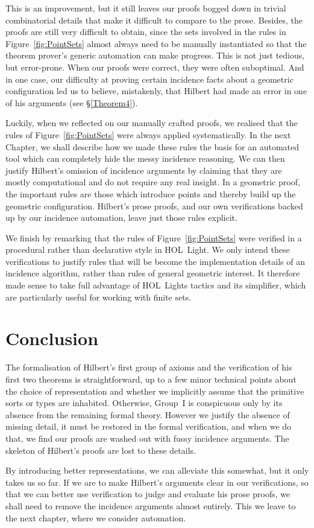 This is an improvement, but it still leaves our proofs bogged down in trivial combinatorial details that make it difficult to compare to the prose. Besides, the proofs are still very difficult to obtain, since the sets involved in the rules in Figure~\ref{fig:PointSets} almost always need to be manually instantiated so that the theorem prover's generic automation can make progress. This is not just tedious, but error-prone. When our proofs were correct, they were often suboptimal. And in one case, our difficulty at proving certain incidence facts about a geometric configuration led us to believe, mistakenly, that Hilbert had made an error in one of his arguments (see \S\ref{Theorem4}).

Luckily, when we reflected on our manually crafted proofs, we realised that the rules of Figure~\ref{fig:PointSets} were always applied systematically. In the next Chapter, we shall describe how we made these rules the basis for an automated tool which can completely hide the messy incidence reasoning. We can then justify Hilbert's omission of incidence arguments by claiming that they are mostly computational and do not require any real insight. In a geometric proof, the important rules are those which introduce points and thereby build up the geometric configuration. Hilbert's prose proofs, and our own verifications backed up by our incidence automation, leave just those rules explicit.

We finish by remarking that the rules of Figure~\ref{fig:PointSets} were verified in a procedural rather than declarative style in HOL~Light. We only intend these verifications to justify rules that will be become the implementation details of an incidence algorithm, rather than rules of general geometric interest. It therefore made sense to take full advantage of HOL~Lights tactics and its simplifier, which are particularly useful for working with finite sets.  

\section{Conclusion}
The formalisation of Hilbert's first group of axioms and the verification of his first two theorems is straightforward, up to a few minor technical points about the choice of representation and whether we implicitly assume that the primitive sorts or types are inhabited. Otherwise, Group~I is conspicuous only by its absence from the remaining formal theory. However we justify the absence of missing detail, it must be restored in the formal verification, and when we do that, we find our proofs are washed out with fussy incidence arguments. The skeleton of Hilbert's proofs are lost to these details. 

By introducing better representations, we can alleviate this somewhat, but it only takes us so far. If we are to make Hilbert's arguments clear in our verifications, so that we can better use verification to judge and evaluate his prose proofs, we shall need to remove the incidence arguments almost entirely. This we leave to the next chapter, where we consider automation.

